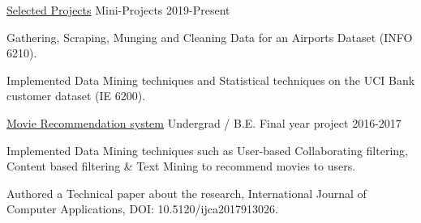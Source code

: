 


\begin{cventries}



\cventry
{\underline{Selected Projects}} %
{Mini-Projects} %
{ } %
{2019-Present} %
{ %
\begin{cvitems}
\item {Gathering, Scraping, Munging and Cleaning Data for an Airports Dataset	 (INFO 6210).}
\item{Implemented Data Mining techniques and Statistical techniques on the UCI Bank customer dataset (IE 6200).}
\end{cvitems}
\vspace{-1.5\baselineskip} 
}

\cventry
{\underline{Movie Recommendation system}} %
{Undergrad / B.E. Final year project} %
{ } %
{2016-2017} %
{ %
\begin{cvitems}
\item {Implemented Data Mining techniques such as User-based Collaborating filtering, Content based filtering \& Text Mining to recommend movies to users.}
\item{Authored a Technical paper about the research, International Journal of Computer Applications, DOI: 10.5120/ijca2017913026.}
\end{cvitems}
\vspace{-.75\baselineskip} 
}






\end{cventries}
